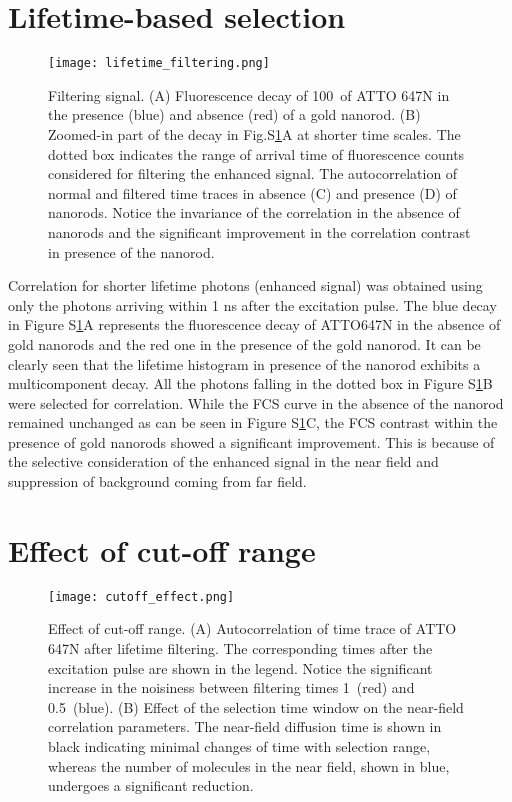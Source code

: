 \section{Lifetime-based selection}
\begin{figure}[ht]
  \centering
  \texttt{[image: lifetime\_filtering.png]}
  \makeatletter
  \renewcommand{\fnum@figure}{\figurename~S\thefigure}
  \makeatother{}
  \caption{Filtering signal. (A) Fluorescence decay of 100~\nM of ATTO 647N in the presence (blue) and absence (red) of a gold nanorod. (B) Zoomed-in part of the decay in Fig.S\ref{SIfig:lifetime-filtering}A at shorter time scales. The dotted box indicates the range of arrival time of fluorescence counts considered for filtering the enhanced signal. The autocorrelation of normal and filtered time traces in absence (C) and presence (D) of nanorods. Notice the invariance of the correlation in the absence of nanorods and the significant improvement in the correlation contrast in presence of the nanorod.}
  \label{SIfig:lifetime-filtering}
\end{figure}
Correlation for shorter lifetime photons (enhanced signal) was obtained using only the photons arriving within 1 ns after the excitation pulse. The blue decay in Figure S\ref{SIfig:lifetime-filtering}A represents the fluorescence decay of ATTO647N in the absence of gold nanorods and the red one in the presence of the gold nanorod. It can be clearly seen that the lifetime histogram in presence of the nanorod exhibits a multicomponent decay. All the photons falling in the dotted box in Figure S\ref{SIfig:lifetime-filtering}B were selected for correlation. While the FCS curve in the absence of the nanorod remained unchanged as can be seen in Figure S\ref{SIfig:lifetime-filtering}C, the FCS contrast within the presence of gold nanorods showed a significant improvement. This is because of the selective consideration of the enhanced signal in the near field and suppression of background coming from far field.

\section{Effect of cut-off range}
\begin{figure}[ht]
  \centering
  \texttt{[image: cutoff\_effect.png]}
  \makeatletter
  \renewcommand{\fnum@figure}{\figurename~S\thefigure}
  \makeatother{}
  \caption{Effect of cut-off range. (A) Autocorrelation of time trace of ATTO 647N after lifetime filtering. The corresponding times after the excitation pulse are shown in the legend. Notice the significant increase in the noisiness between filtering times 1~\ns (red) and 0.5~\ns (blue). (B) Effect of the selection time window on the near-field correlation parameters. The near-field diffusion time is shown in black indicating minimal changes of time with selection range, whereas the number of molecules in the near field, shown in blue, undergoes a significant reduction.}
  \label{SIfig:cutoff-effect}
\end{figure}

